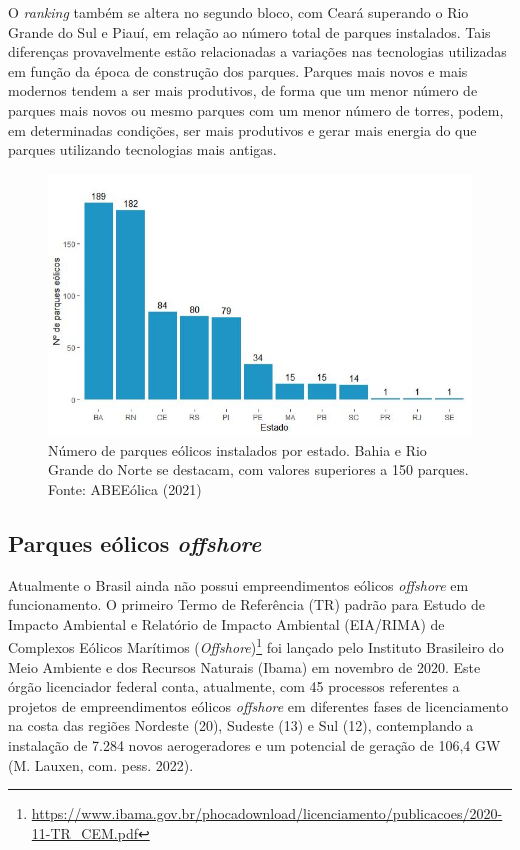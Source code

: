 \documentclass[
  oneside]{scrbook}
\DeclareRobustCommand{\href}[2]{#2\footnote{\url{#1}}}
\begin{document}
O \emph{ranking} também se altera no segundo bloco, com Ceará superando o Rio Grande do Sul e Piauí, em relação ao número total de parques instalados. Tais diferenças provavelmente estão relacionadas a variações nas tecnologias utilizadas em função da época de construção dos parques. Parques mais novos e mais modernos tendem a ser mais produtivos, de forma que um menor número de parques mais novos ou mesmo parques com um menor número de torres, podem, em determinadas condições, ser mais produtivos e gerar mais energia do que parques utilizando tecnologias mais antigas.

\begin{figure}[H]

{\centering \includegraphics[width=0.8\linewidth]{imagens/cap01/Figura_1.6_1} 

}

\caption{Número de parques eólicos instalados por estado. Bahia e Rio Grande do Norte se destacam, com valores superiores a 150 parques. Fonte: ABEEólica (2021)}\label{fig:06}
\end{figure}

\hypertarget{parques-euxf3licos-offshore}{%
\subsection{\texorpdfstring{Parques eólicos \emph{offshore}}{Parques eólicos offshore}}\label{parques-euxf3licos-offshore}}

Atualmente o Brasil ainda não possui empreendimentos eólicos \emph{offshore} em funcionamento. O primeiro \href{https://www.ibama.gov.br/phocadownload/licenciamento/publicacoes/2020-11-TR_CEM.pdf}{Termo de Referência (TR) padrão para Estudo de Impacto Ambiental e Relatório de Impacto Ambiental (EIA/RIMA) de Complexos Eólicos Marítimos (\emph{Offshore})} foi lançado pelo Instituto Brasileiro do Meio Ambiente e dos Recursos Naturais (Ibama) em novembro de 2020. Este órgão licenciador federal conta, atualmente, com 45 processos referentes a projetos de empreendimentos eólicos \emph{offshore} em diferentes fases de licenciamento na costa das regiões Nordeste (20), Sudeste (13) e Sul (12), contemplando a instalação de 7.284 novos aerogeradores e um potencial de geração de 106,4 GW (M. Lauxen, com. pess. 2022).
\end{document}
